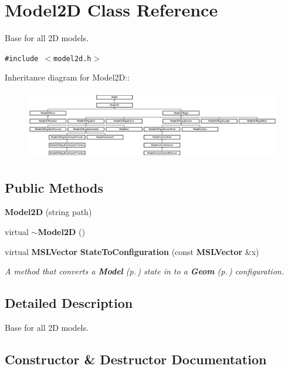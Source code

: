 \section{Model2D  Class Reference}
\label{classModel2D}
Base for all 2D models. 


{\tt \#include $<$model2d.h$>$}

Inheritance diagram for Model2D::\begin{figure}[H]
\begin{center}
\leavevmode
\includegraphics[height=3.03318cm]{classModel2D}
\end{center}
\end{figure}
\subsection*{Public Methods}
\begin{CompactItemize}
\item 
{\bf Model2D} (string path)
\item 
virtual {\bf $\sim$Model2D} ()
\item 
virtual {\bf MSLVector} {\bf State\-To\-Configuration} (const {\bf MSLVector} \&x)
\begin{CompactList}\small\item\em A method that converts a {\bf Model} {\rm (p.\,\pageref{classModel})} state in to a {\bf Geom} {\rm (p.\,\pageref{classGeom})} configuration.\item\end{CompactList}\end{CompactItemize}


\subsection{Detailed Description}
Base for all 2D models.



\subsection{Constructor \& Destructor Documentation}
